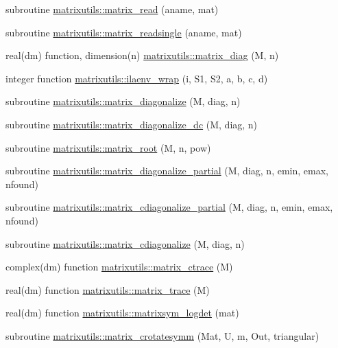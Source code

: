 \begin{DoxyCompactItemize}
\item 
subroutine \mbox{\hyperlink{namespacematrixutils_ac778ea47bab010c70f3d6f00838e4668}{matrixutils\+::matrix\+\_\+read}} (aname, mat)
\item 
subroutine \mbox{\hyperlink{namespacematrixutils_a6c4f5774cfa213609562eb2a5dfeca92}{matrixutils\+::matrix\+\_\+readsingle}} (aname, mat)
\item 
real(dm) function, dimension(n) \mbox{\hyperlink{namespacematrixutils_a6b563974ed42131dcdd0b7c5e009fb33}{matrixutils\+::matrix\+\_\+diag}} (M, n)
\item 
integer function \mbox{\hyperlink{namespacematrixutils_af41b3d5784e02032b5e22a16d76eca49}{matrixutils\+::ilaenv\+\_\+wrap}} (i, S1, S2, a, b, c, d)
\item 
subroutine \mbox{\hyperlink{namespacematrixutils_aa94ed3ad0cf6b18002c5f8ca9cd8b948}{matrixutils\+::matrix\+\_\+diagonalize}} (M, diag, n)
\item 
subroutine \mbox{\hyperlink{namespacematrixutils_a03b181040e90fb7d7693f10d0716a04f}{matrixutils\+::matrix\+\_\+diagonalize\+\_\+dc}} (M, diag, n)
\item 
subroutine \mbox{\hyperlink{namespacematrixutils_a76928f01b83f388ddb51ee3e256cd3a5}{matrixutils\+::matrix\+\_\+root}} (M, n, pow)
\item 
subroutine \mbox{\hyperlink{namespacematrixutils_a1f7b4399f422b8532d242374454b9e03}{matrixutils\+::matrix\+\_\+diagonalize\+\_\+partial}} (M, diag, n, emin, emax, nfound)
\item 
subroutine \mbox{\hyperlink{namespacematrixutils_a30f09f7f2856414c7cfdc635a108039a}{matrixutils\+::matrix\+\_\+cdiagonalize\+\_\+partial}} (M, diag, n, emin, emax, nfound)
\item 
subroutine \mbox{\hyperlink{namespacematrixutils_a29011a04a13e1b49c36d226591b3e5a4}{matrixutils\+::matrix\+\_\+cdiagonalize}} (M, diag, n)
\item 
complex(dm) function \mbox{\hyperlink{namespacematrixutils_af3bd404fd6685b9f8d2863bb4a3c06e4}{matrixutils\+::matrix\+\_\+ctrace}} (M)
\item 
real(dm) function \mbox{\hyperlink{namespacematrixutils_aba34e30d438cd387bb0f57e16d60b364}{matrixutils\+::matrix\+\_\+trace}} (M)
\item 
real(dm) function \mbox{\hyperlink{namespacematrixutils_a4117e3e0068005bf79a0db9745a8dde6}{matrixutils\+::matrixsym\+\_\+logdet}} (mat)
\item 
subroutine \mbox{\hyperlink{namespacematrixutils_a289ea264af6294e91e4906d329ab1bca}{matrixutils\+::matrix\+\_\+crotatesymm}} (Mat, U, m, Out, triangular)

\end{DoxyCompactItemize}
